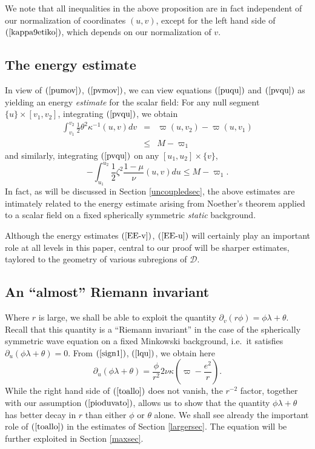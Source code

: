 \documentclass{article}
\begin{document}
We note that all inequalities in the above proposition are in fact
independent of our normalization of coordinates $(u,v)$, except
for the left hand side of $(\ref{kappa9etiko})$, which depends
on our normalization of $v$.

\subsection{The energy estimate}
In view of $(\ref{pumov})$, $(\ref{pvmov})$, we can view equations
$(\ref{puqu})$ and $(\ref{pvqu})$ as yielding an energy \emph{estimate}
for the scalar field: For any null
segment $\{u\}\times[v_1,v_2]$,
integrating $(\ref{pvqu})$, 
we obtain
\begin{eqnarray}
\label{EE-v}
\nonumber
\int_{v_1}^{v_2}{\frac12\theta^2\kappa^{-1}(u,v)dv}	& = &	
\varpi(u,v_2)-\varpi(u,v_1)\\
					&\le&	M-\varpi_1
\end{eqnarray}
and similarly, integrating $(\ref{pvqu})$ on any
$[u_1,u_2]\times \{v\}$, 
\begin{equation}
\label{EE-u}
-\int_{u_1}^{u_2}{\frac12\zeta^2\frac{1-\mu}{\nu}(u,v)du}	\le	M-\varpi_1.
\end{equation}
In fact, as
will be discussed in Section \ref{uncoupledsec}, the above estimates are intimately
related to the energy estimate arising from Noether's theorem applied
to a scalar field
on a fixed spherically symmetric \emph{static} background.

Although the energy estimates $(\ref{EE-v})$, $(\ref{EE-u})$ will certainly 
play an important role at all levels in this paper,
central to our proof will be sharper estimates, taylored to the geometry
of various subregions of $\mathcal{D}$.

\subsection{An ``almost'' Riemann invariant}
Where $r$ is large, we shall be able to exploit the quantity
$\partial_v(r\phi)=\phi\lambda+\theta$. Recall that this quantity
is a ``Riemann invariant''
in the case of the spherically symmetric wave equation on a fixed
Minkowski background, i.e.~it satisfies
$\partial_u(\phi\lambda+\theta)=0$.
From $(\ref{sign1})$, $(\ref{lqu})$, we obtain here
\begin{equation}
\label{toallo}
\partial_u(\phi\lambda+\theta)=\frac{\phi}{r^2}2\nu\kappa
				\left(\varpi-\frac{e^2}r\right).
\end{equation}
While the right hand side of $(\ref{toallo})$ does not vanish,
the $r^{-2}$ factor,
together with our assumption $(\ref{pioduvato})$,
allows us to show that the quantity $\phi\lambda+\theta$
has better decay in $r$ than either $\phi$ or $\theta$ alone. We shall
see already the important role
of $(\ref{toallo})$ in the estimates of Section \ref{largersec}. The equation
will be further exploited in Section \ref{maxsec}.
\end{document}
